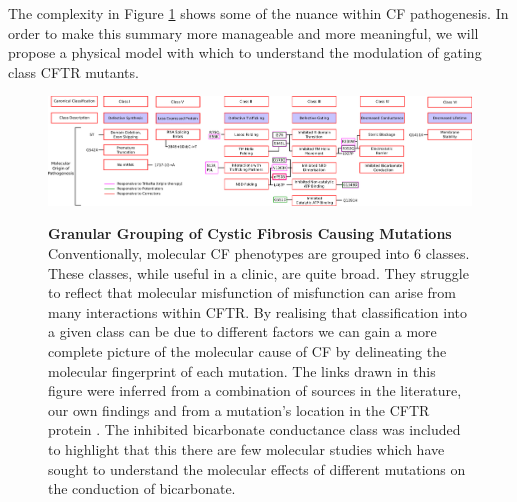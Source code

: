 The complexity in Figure \ref{granular_classification} shows some of the nuance within CF pathogenesis. In order to make this summary more manageable and more meaningful, we will propose a physical model with which to understand the modulation of gating class CFTR mutants. 

\begin{landscape}
\begin{figure}
	\begin{center}
	\includegraphics[width=1.5\textwidth]{figures/perspective/classes_mutations.pdf}\\
	\end{center}
	\captionsetup{singlelinecheck = false, justification=raggedright}
	\caption[Granular grouping of CF pathogenesis]{\textbf{Granular Grouping of Cystic Fibrosis Causing Mutations}{ Conventionally, molecular CF phenotypes are grouped into 6 classes. These classes, while useful in a clinic, are quite broad. They struggle to reflect that molecular misfunction of misfunction can arise from many interactions within CFTR. By realising that classification into a given class can be due to different factors we can gain a more complete picture of the molecular cause of CF by delineating the molecular fingerprint of each mutation. The links drawn in this figure were inferred from a combination of sources in the literature, our own findings and from a mutation's location in the CFTR protein \cite{bompadre2007, gong2004, wong2022, vangoor2009, vangoor2014, hoffmann2018, thelin2007, gene2008, trikafta_website, phuan2018, ensinck2022}. The inhibited bicarbonate conductance class was included to highlight that this there are few molecular studies which have sought to understand the molecular effects of different mutations on the conduction of bicarbonate. }
	}

	\label{granular_classification}
\end{figure}
\end{landscape}

